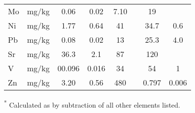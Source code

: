 \begin{table}[ht!]
{\begin{threeparttable}
\begin{tabular}{lccccccc}
Mo & mg/kg & 0.06 & 0.02 & 7.10 &  & 19 &  \\
Ni & mg/kg & 1.77 & 0.64 & 41 &  & 34.7 & 0.6 \\
Pb & mg/kg & 0.08 & 0.02 & 13 &  & 25.3 & 4.0 \\
Sr & mg/kg & 36.3 & 2.1 & 87 &  & 120 &  \\
V & mg/kg & 00.096 & 0.016 & 34 &  & 54 & 1 \\
Zn & mg/kg & 3.20 & 0.56 & 480 &  & 0.797 & 0.006\\ \bottomrule   
\end{tabular}
\begin{tablenotes}
\item \textsuperscript{*} Calculated as by subtraction of all other elements listed.
\end{tablenotes}
\end{threeparttable}}
\end{table}

